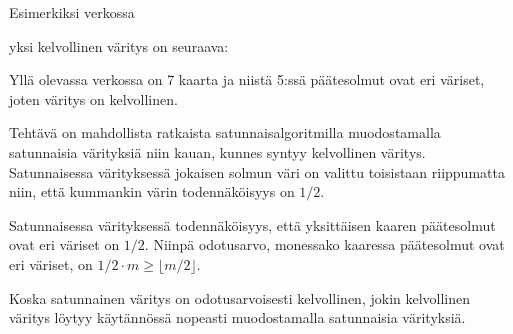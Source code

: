 Esimerkiksi verkossa
\begin{center}
\end{center}
yksi kelvollinen väritys on seuraava:
\begin{center}
\end{center}
Yllä olevassa verkossa on 7 kaarta ja niistä 5:ssä
päätesolmut ovat eri väriset,
joten väritys on kelvollinen.

Tehtävä on mahdollista ratkaista satunnaisalgoritmilla
muodostamalla satunnaisia värityksiä niin kauan,
kunnes syntyy kelvollinen väritys.
Satunnaisessa värityksessä jokaisen solmun väri on
valittu toisistaan riippumatta niin,
että kummankin värin todennäköisyys on $1/2$.

Satunnaisessa värityksessä todennäköisyys, että yksittäisen kaaren päätesolmut
ovat eri väriset on $1/2$. Niinpä odotusarvo, monessako kaaressa
päätesolmut ovat eri väriset, on $1/2 \cdot m \ge \lfloor m/2 \rfloor$.

Koska satunnainen väritys on odotusarvoisesti kelvollinen,
jokin kelvollinen väritys löytyy käytännössä nopeasti
muodostamalla satunnaisia värityksiä.